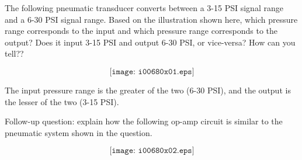 

The following pneumatic transducer converts between a 3-15 PSI signal range and a 6-30 PSI signal range.  Based on the illustration shown here, which pressure range corresponds to the input and which pressure range corresponds to the output?  Does it input 3-15 PSI and output 6-30 PSI, or vice-versa?  How can you tell??

$$\texttt{[image: i00680x01.eps]}$$







The input pressure range is the greater of the two (6-30 PSI), and the output is the lesser of the two (3-15 PSI).

\vskip 10pt

Follow-up question: explain how the following op-amp circuit is similar to the pneumatic system shown in the question.

$$\texttt{[image: i00680x02.eps]}$$











